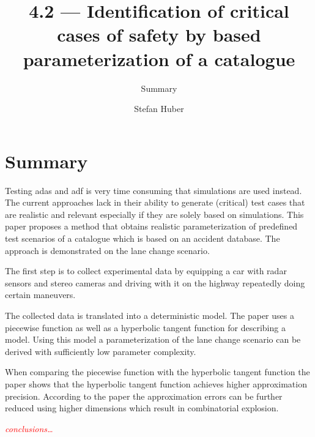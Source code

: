 \documentclass[oneside, notitlepage, twocolumn]{scrartcl}
\title{\LARGE 4.2 --- Identification of critical cases of \glstext{adas} safety by \glstext{fot} based parameterization of a catalogue}
\subtitle{Summary}
\author{Stefan Huber}
\newcommand{\draft}[1]{\textcolor{red}{\textit{#1}}}
\begin{document}
\maketitle

\section{Summary}
Testing \gls{adas} and \gls{adf} is very time consuming that simulations are used instead.
The current approaches lack in their ability to generate (critical) test cases that are realistic and relevant especially if they are solely based on simulations.
This paper proposes a method that obtains realistic parameterization of predefined test scenarios of a catalogue which is based on an accident database.
The approach is demonstrated on the lane change scenario.\par
The first step is to collect experimental data by equipping a car with radar sensors and stereo cameras and driving with it on the highway repeatedly doing certain maneuvers.\par
The collected data is translated into a deterministic model.
The paper uses a piecewise function as well as a hyperbolic tangent function for describing a model.
Using this model a parameterization of the lane change scenario can be derived with sufficiently low parameter complexity.\par
When comparing the piecewise function with the hyperbolic tangent function the paper shows that the hyperbolic tangent function achieves higher approximation precision.
According to the paper the approximation errors can be further reduced using higher dimensions which result in combinatorial explosion.\par
\draft{conclusions\ldots}
\end{document}

